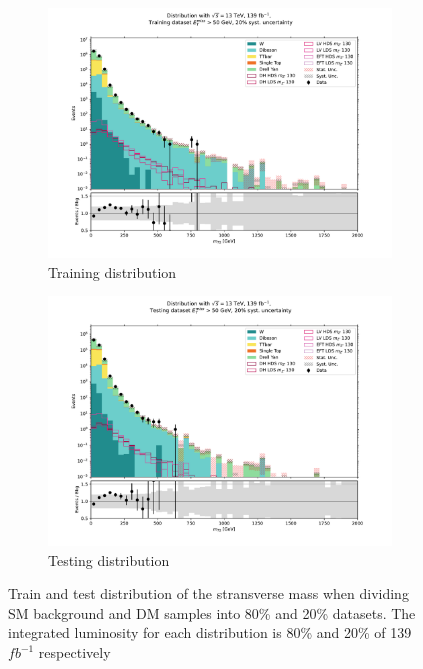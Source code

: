 \documentclass[12pt, a4paper]{book}
\begin{document}
\begin{figure}[!ht]
	\centering
	\begin{subfigure}[b]{0.49\textwidth}
        \centering
        \includegraphics[width=1\textwidth]{mt2_train.pdf}
        \caption{Training distribution}
     \end{subfigure}
     \hfill
     \begin{subfigure}[b]{0.49\textwidth}
        \centering
        \includegraphics[width=1\textwidth]{mt2_test.pdf}
        \caption{Testing distribution}
     \end{subfigure}
	\caption[Train-test split distribution]{Train and test distribution of the stransverse mass when dividing SM background and DM samples into 80\% and 20\% datasets. The integrated luminosity for each distribution is 80\% and 20\% of 139 $fb^{-1}$ respectively}\label{fig:train-test}
\end{figure}
\end{document}
